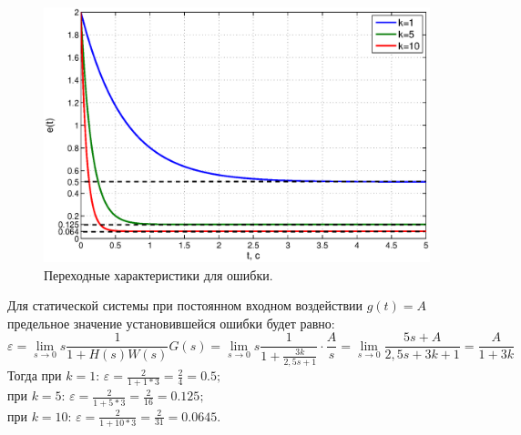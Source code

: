 \documentclass[12pt,a4paper]{article}
\begin{document}
\begin{figure}[H]
	\centering
	\includegraphics[width=1\linewidth]{1.1.2.eps}
	\caption{Переходные характеристики для ошибки.}
\end{figure}
Для статической системы при постоянном входном воздействии $g(t)=A$ предельное значение установившейся ошибки будет равно:
\begin{equation}
    \varepsilon = \lim_{s\to 0}s\frac{1}{1+H(s)W(s)}G(s) = \lim_{s\to0} s\frac{1}{1+ \displaystyle{\frac{3k}{2,5s+1}}}\cdot\frac{A}{s} = \lim_{s\to0} \frac{5s+A}{2,5s+3k+1} = \frac{A}{1+3k}
\end{equation}
Тогда при $k=1$: $\varepsilon = \displaystyle{\frac{2}{1+1*3}} = \frac{2}{4} = 0.5;$\\
при $k=5$: $\varepsilon = \displaystyle{\frac{2}{1+5*3}} = \frac{2}{16} = 0.125;$\\
при $k=10$: $\varepsilon = \displaystyle{\frac{2}{1+10*3}} = \frac{2}{31} = 0.0645.$\\
\end{document}
